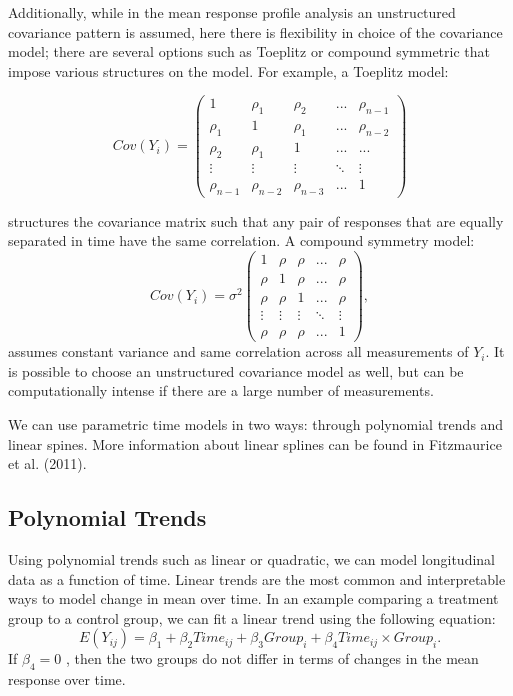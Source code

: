 \documentclass[12pt, twoside]{amherstthesis}
\begin{document}
Additionally, while in the mean response profile analysis an unstructured covariance pattern is assumed, here there is flexibility in choice of the covariance model; there are several options such as Toeplitz or compound symmetric that impose various structures on the model. For example, a Toeplitz model:

\[Cov (Y_i) = \begin{pmatrix} 1 & \rho_1 & \rho_2 & ... & \rho_{n-1} \\ \rho_1 & 1 & \rho_1 & ... & \rho_{n-2} \\ \rho_2 & \rho_1 & 1 & ...& ... \\ \vdots & \vdots & \vdots & \ddots & \vdots \\ \rho_{n-1} & \rho_{n-2} & \rho_{n-3} & ... & 1  \end{pmatrix}\]

structures the covariance matrix such that any pair of responses that are equally separated in time have the same correlation. A compound symmetry model: \[Cov (Y_i) = \sigma^2\begin{pmatrix} 1 & \rho & \rho & ... & \rho \\ \rho & 1 & \rho & ... & \rho \\ \rho & \rho & 1 & ...& \rho \\ \vdots & \vdots & \vdots & \ddots& \vdots \\ \rho & \rho & \rho & ... & 1   \end{pmatrix}, \] assumes constant variance and same correlation across all measurements of \(Y_i.\) It is possible to choose an unstructured covariance model as well, but can be computationally intense if there are a large number of measurements.

We can use parametric time models in two ways: through polynomial trends and linear spines. More information about linear splines can be found in Fitzmaurice et al. (2011).

\hypertarget{polynomial-trends}{%
\subsection{Polynomial Trends}\label{polynomial-trends}}

Using polynomial trends such as linear or quadratic, we can model longitudinal data as a function of time. Linear trends are the most common and interpretable ways to model change in mean over time. In an example comparing a treatment group to a control group, we can fit a linear trend using the following equation: \[E(Y_{ij}) = \beta_1 + \beta_2Time_{ij}+\beta_3Group_i+\beta_4Time_{ij} \times Group_i.\] If \(\beta_4 = 0\) , then the two groups do not differ in terms of changes in the mean response over time.
\end{document}
